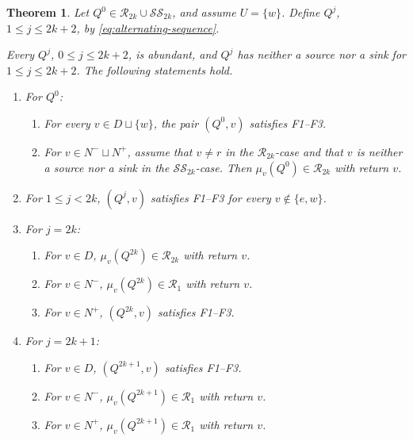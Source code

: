 \documentclass[10pt,a4paper]{amsart}
\newtheorem{theorem}{Theorem}[section]
\theoremstyle{definition}
\theoremstyle{definition}
\numberwithin{equation}{section}
\numberwithin{table}{section}
\newcommand{\nminus}{N^{-}}
\newcommand{\nplus}{N^{+}}
\newcommand{\Rclass}{\mathcal{R}}
\newcommand{\SSclass}{\mathcal{SS}}
\newcommand{\Qalt}[1]{Q^{#1}}
\begin{document}
\begin{theorem}\label{thm:alternating-mutations}
Let $\Qalt{0}\in\Rclass_{2k}\cup\SSclass_{2k}$, and assume $U=\{w\}$.
Define $\Qalt{j}$, $1\le j\le2k+2$, by
\eqref{eq:alternating-sequence}.

Every $\Qalt{j}$, $0\le j\le2k+2$, is abundant, and $\Qalt{j}$ has neither
a source nor a sink for $1\le j\le2k+2$. The following statements hold.
\begin{enumerate}[label=\textup{(\roman*)},leftmargin=2.35em,itemsep=1pt,topsep=1pt]
\item For $\Qalt{0}$:
\begin{enumerate}[label=\textup{(\alph*)},leftmargin=2.15em,itemsep=0pt,topsep=0pt]
\item For every $v\in D\sqcup\{w\}$, the pair $(\Qalt{0},v)$ satisfies
F1--F3.
\item For $v\in\nminus\sqcup\nplus$, assume that $v\ne r$ in the
$\Rclass_{2k}$-case and that $v$ is neither a source nor a sink in the
$\SSclass_{2k}$-case. Then
$\mu_v(\Qalt{0})\in\Rclass_{2k}$ with return $v$.
\end{enumerate}

\item For $1\le j<2k$, $(\Qalt{j},v)$ satisfies F1--F3 for every $v\notin\{e,w\}$.

\item For $j=2k$:
\begin{enumerate}[label=\textup{(\alph*)},leftmargin=2.15em,itemsep=0pt,topsep=0pt]
\item For $v\in D$, $\mu_v(\Qalt{2k})\in\Rclass_{2k}$ with return $v$.
\item For $v\in\nminus$, $\mu_v(\Qalt{2k})\in\Rclass_1$ with return $v$.
\item For $v\in\nplus$, $(\Qalt{2k},v)$ satisfies F1--F3.
\end{enumerate}

\item For $j=2k+1$:
\begin{enumerate}[label=\textup{(\alph*)},leftmargin=2.15em,itemsep=0pt,topsep=0pt]
\item For $v\in D$, $(\Qalt{2k+1},v)$ satisfies F1--F3.
\item For $v\in\nminus$, $\mu_v(\Qalt{2k+1})\in\Rclass_1$ with return $v$.
\item For $v\in\nplus$, $\mu_v(\Qalt{2k+1})\in\Rclass_1$ with return $v$.
\end{enumerate}


\end{enumerate}
\end{theorem}
\end{document}
